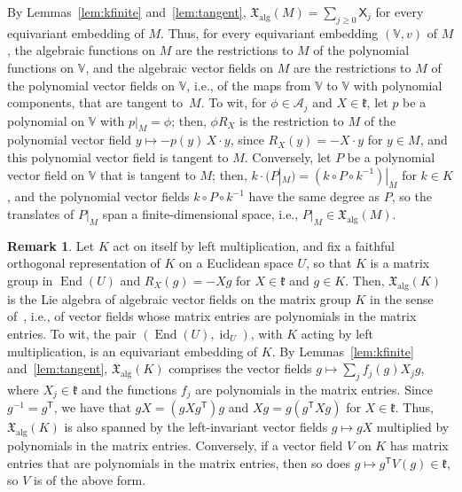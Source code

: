 \documentclass{article}
\newcommand{\frakk}{\mathfrak{k}}
\newcommand{\xalg}{\mathfrak X_{\mathrm{alg}}}
\newcommand{\sX}{\mathsf{X}}
\theoremstyle{definition}
\newtheorem{remark}{Remark}
\theoremstyle{plain}
\begin{document}
 By Lemmas~\ref{lem:kfinite} and~\ref{lem:tangent}, $\xalg(M)=\sum_{j\geq0}\sX_j$ for every equivariant embedding of $M$.
Thus, for every equivariant embedding $(\mathbb V,v)$ of $M$, the algebraic functions on $M$ are the restrictions to $M$ of the polynomial functions on $\mathbb V$, and the algebraic vector fields on $M$ are the restrictions to $M$ of the polynomial vector fields on $\mathbb V$, i.e., of the maps from $\mathbb V$ to $\mathbb V$ with polynomial components, that are tangent to~$M$.
To wit, for $\phi\in\mathcal A_j$ and $X\in\frakk$, let $p$ be a polynomial on $\mathbb V$ with $p|_M=\phi$; then, $\phi R_X$ is the restriction to $M$ of the polynomial vector field $y\mapsto-p(y)\,X\cdot y$, since $R_X(y)=-X\cdot y$ for $y\in M$, and this polynomial vector field is tangent to $M$.
Conversely, let $P$ be a polynomial vector field on $\mathbb V$ that is tangent to $M$; then, $k\cdot(P|_M)=(k\circ P\circ k^{-1})|_M$ for $k\in K$, and the polynomial vector fields $k\circ P\circ k^{-1}$ have the same degree as $P$, so the translates of $P|_M$ span a finite-dimensional space, i.e., $P|_M\in\xalg(M)$.





\begin{remark}\label{rem:groups}
Let $K$ act on itself by left multiplication, and fix a faithful orthogonal representation of $K$ on a Euclidean space $U$,
    so that $K$ is a matrix group in $\operatorname{End}(U)$ and $R_X(g)=-Xg$ for $X\in\frakk$ and $g\in K$.
Then, $\xalg(K)$ is the Lie algebra of algebraic vector fields on the matrix group $K$ in the sense of~\cite{CofD3gen}, i.e., of vector fields whose matrix entries are polynomials in the matrix entries.
To wit, the pair $(\operatorname{End}(U),\operatorname{id}_U)$, with $K$ acting by left multiplication, is an equivariant embedding of $K$.
By Lemmas~\ref{lem:kfinite} and~\ref{lem:tangent}, $\xalg(K)$ comprises the vector fields $g\mapsto\sum_jf_j(g)X_jg$, where $X_j\in\frakk$ and the functions $f_j$ are polynomials in the matrix entries.
Since $g^{-1}=g^{\mathsf T}$, we have that $gX=(gXg^{\mathsf T})g$ and $Xg=g(g^{\mathsf T}Xg)$ for $X\in\frakk$.
Thus, $\xalg(K)$ is also spanned by the left-invariant vector fields $g\mapsto gX$ multiplied by polynomials in the matrix entries.
Conversely, if a vector field $V$ on $K$ has matrix entries that are polynomials in the matrix entries,
  then so does $g\mapsto g^{\mathsf T}V(g)\in\frakk$, so $V$ is of the above form.
\end{remark}
\end{document}

